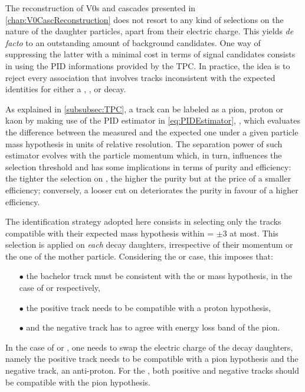 The reconstruction of V0s and cascades presented in \chap\ref{chap:V0CascReconstruction} does not resort to any kind of selections on the nature of the daughter particles, apart from their electric charge. This yields \textit{de facto} to an outstanding amount of background candidates. One way of suppressing the latter with a minimal cost in terms of signal candidates consists in using the PID informations provided by the TPC. In practice, the idea is to reject every association that involves tracks inconsistent with the expected identities for either a \rmKzeroS, \rmLambdaPM, \rmXiPM or \rmOmegaPM decay.

As explained in \Sec\ref{subsubsec:TPC}, a track can be labeled as a pion, proton or kaon by making use of the PID estimator in \eq\ref{eq:PIDEstimator}, \Nsigma, which evaluates the difference between the measured \dEdx and the expected one under a given particle mass hypothesis in units of relative resolution. The separation power of such estimator evolves with the particle momentum which, in turn, influences the selection threshold and has some implications in terms of purity and efficiency: the tighter the selection on \Nsigma, the higher the purity but at the price of a smaller efficiency; conversely, a looser cut on \Nsigma deteriorates the purity in favour of a higher efficiency.

The identification strategy adopted here consists in selecting only the tracks compatible with their expected mass hypothesis within \Nsigma = $\pm 3$ at most. This selection is applied on \emph{each} decay daughters, irrespective of their momentum or the one of the mother particle. Considering the \rmXiM or \rmOmegaM case, this imposes that:
\begin{itemize}
\item[$\bullet$] the bachelor track must be consistent with the \rmPiMinus or \rmKMinus mass hypothesis, in the case of \rmXiM or \rmOmegaM respectively,
\item[$\bullet$] the positive track needs to be compatible with a proton hypothesis,
\item[$\bullet$] and the negative track has to agree with energy loss band of the pion.
\end{itemize}
In the case of \rmAxiP or \rmAomegaP, one needs to swap the electric charge of the  decay daughters, namely the positive track needs to be compatible with a pion hypothesis and the negative track, an anti-proton. For the \rmKzeroS, both positive and negative tracks should be compatible with the pion hypothesis.



